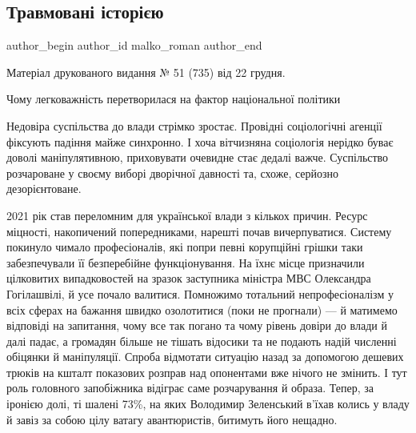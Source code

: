  
 
 
 
 
\subsection{Травмовані історією}
\label{sec:29_12_2021.stz.news.ua.tyzhden.1.travma_istoria}

\ifcmt
 author_begin
   author_id malko_roman
 author_end
\fi

Матеріал друкованого видання № 51 (735) від 22 грудня.

Чому легковажність перетворилася на фактор національної політики

Недовіра суспільства до влади стрімко зростає. Провідні соціологічні агенції
фіксують падіння майже синхронно. І хоча вітчизняна соціологія нерідко буває
доволі маніпулятивною, приховувати очевидне стає дедалі важче. Суспільство
розчароване у своєму виборі дворічної давності та, схоже, серйозно
дезорієнтоване.

2021 рік став переломним для української влади з кількох причин. Ресурс
міцності, накопичений попередниками, нарешті почав вичерпуватися. Систему
покинуло чимало професіоналів, які попри певні корупційні грішки таки
забезпечували її безперебійне функціонування. На їхнє місце призначили
цілковитих випадковостей на зразок заступника міністра МВС Олександра
Гогілашвілі, й усе почало валитися. Помножимо тотальний непрофесіоналізм у всіх
сферах на бажання швидко озолотитися (поки не прогнали) — й матимемо відповіді
на запитання, чому все так погано та чому рівень довіри до влади й далі падає,
а громадян більше не тішать відосики та не подають надій численні обіцянки й
маніпуляції. Спроба відмотати ситуацію назад за допомогою дешевих трюків на
кшталт показових розправ над опонентами вже нічого не змінить. І тут роль
головного запобіжника відіграє саме розчарування й образа. Тепер, за іронією
долі, ті шалені 73\%, на яких Володимир Зеленський в’їхав колись у владу й
завіз за собою цілу ватагу авантюристів, битимуть його нещадно.

